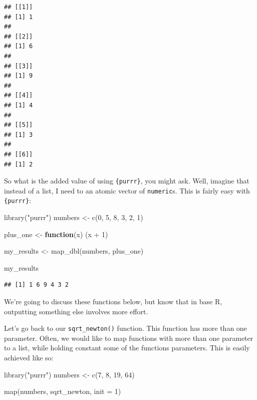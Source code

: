 \documentclass[
]{article}
\newenvironment{Shaded}{\begin{snugshade}}{\end{snugshade}}
\newcommand{\AttributeTok}[1]{\textcolor[rgb]{0.77,0.63,0.00}{#1}}
\newcommand{\ControlFlowTok}[1]{\textcolor[rgb]{0.13,0.29,0.53}{\textbf{#1}}}
\newcommand{\DecValTok}[1]{\textcolor[rgb]{0.00,0.00,0.81}{#1}}
\newcommand{\FunctionTok}[1]{\textcolor[rgb]{0.00,0.00,0.00}{#1}}
\newcommand{\NormalTok}[1]{#1}
\newcommand{\OtherTok}[1]{\textcolor[rgb]{0.56,0.35,0.01}{#1}}
\newcommand{\SpecialCharTok}[1]{\textcolor[rgb]{0.00,0.00,0.00}{#1}}
\newcommand{\StringTok}[1]{\textcolor[rgb]{0.31,0.60,0.02}{#1}}
\begin{document}
\begin{verbatim}
## [[1]]
## [1] 1
## 
## [[2]]
## [1] 6
## 
## [[3]]
## [1] 9
## 
## [[4]]
## [1] 4
## 
## [[5]]
## [1] 3
## 
## [[6]]
## [1] 2
\end{verbatim}

So what is the added value of using \texttt{\{purrr\}}, you might ask. Well, imagine that instead of a list,
I need to an atomic vector of \texttt{numeric}s. This is fairly easy with \texttt{\{purrr\}}:

\begin{Shaded}
\begin{Highlighting}[]
\FunctionTok{library}\NormalTok{(}\StringTok{"purrr"}\NormalTok{)}
\NormalTok{numbers }\OtherTok{\textless{}{-}} \FunctionTok{c}\NormalTok{(}\DecValTok{0}\NormalTok{, }\DecValTok{5}\NormalTok{, }\DecValTok{8}\NormalTok{, }\DecValTok{3}\NormalTok{, }\DecValTok{2}\NormalTok{, }\DecValTok{1}\NormalTok{)}

\NormalTok{plus\_one }\OtherTok{\textless{}{-}} \ControlFlowTok{function}\NormalTok{(x) (x }\SpecialCharTok{+} \DecValTok{1}\NormalTok{)}

\NormalTok{my\_results }\OtherTok{\textless{}{-}} \FunctionTok{map\_dbl}\NormalTok{(numbers, plus\_one)}

\NormalTok{my\_results}
\end{Highlighting}
\end{Shaded}

\begin{verbatim}
## [1] 1 6 9 4 3 2
\end{verbatim}

We're going to discuss these functions below, but know that in base R, outputting something else
involves more effort.

Let's go back to our \texttt{sqrt\_newton()} function. This function has more than one parameter. Often,
we would like to map functions with more than one parameter to a list, while holding constant
some of the functions parameters. This is easily achieved like so:

\begin{Shaded}
\begin{Highlighting}[]
\FunctionTok{library}\NormalTok{(}\StringTok{"purrr"}\NormalTok{)}
\NormalTok{numbers }\OtherTok{\textless{}{-}} \FunctionTok{c}\NormalTok{(}\DecValTok{7}\NormalTok{, }\DecValTok{8}\NormalTok{, }\DecValTok{19}\NormalTok{, }\DecValTok{64}\NormalTok{)}

\FunctionTok{map}\NormalTok{(numbers, sqrt\_newton, }\AttributeTok{init =} \DecValTok{1}\NormalTok{)}
\end{Highlighting}
\end{Shaded}
\end{document}
